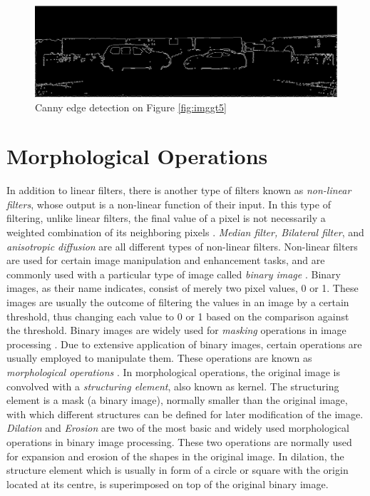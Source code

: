 \begin{figure}[H]
\centering
\includegraphics[scale=0.35]{mask5nodil}
\caption{Canny edge detection on Figure \protect\ref{fig:imggt5}}
\label{fig:edgenodil}
\end{figure} 

\section{Morphological Operations}
In addition to linear filters, there is another type of filters known as {\it non-linear filters}, whose output is a non-linear function of their input. 
In this type of filtering, unlike linear filters, the final value of a pixel is not necessarily 
a weighted combination of its neighboring pixels \cite{sze11}. 
{\it Median filter, Bilateral filter}, and {\it anisotropic diffusion} are all different types of non-linear filters. Non-linear filters are used for certain image manipulation 
and enhancement tasks, and are commonly used with a particular type of image called {\it binary
image} \cite{sze11}. Binary images, as their name indicates, consist of merely two pixel values, 0 or 1. These images are usually the outcome of filtering the values in an image 
by a certain threshold, thus changing each value to 0 or 1 based on the comparison against the threshold. Binary images are
widely used for {\it masking} operations in image processing \cite{sze11}. Due to extensive application of binary images, certain operations are usually employed to manipulate them. 
These operations are known as {\it morphological operations} \cite{ritt00}.
In morphological operations, the original image is convolved with a {\it structuring element}, also known as kernel. 
The structuring element is a mask (a binary image), normally smaller than the original image, 
with which different structures can be defined for later modification of the image. 
{\it Dilation} and {\it Erosion} are two of the most basic and widely used morphological operations in binary image processing.
These two operations are normally used for expansion and erosion of the shapes in the original image. 
In dilation, the structure element which is usually in form of a circle or square with the origin located at its centre, is superimposed on top of the original binary image.
